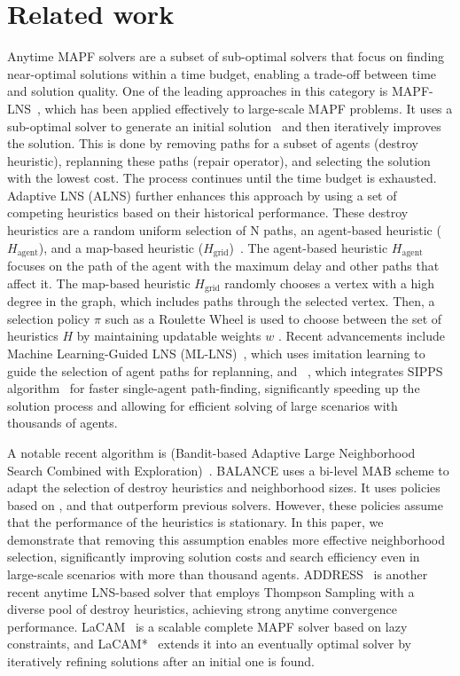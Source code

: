 \documentclass[review]{jair}
\begin{document}
\section{Related work} \label{sec:related-work}
Anytime MAPF solvers are a subset of sub-optimal solvers that focus on finding near-optimal solutions within a time budget, enabling a trade-off between time and solution quality. One of the leading approaches in this category is MAPF-LNS~\citep{LNS}, which has been applied effectively to large-scale MAPF problems. It uses a sub-optimal solver to generate an initial solution~\citep{PP, PPS} and then iteratively improves the solution. This is done by removing paths for a subset of agents (destroy heuristic), replanning these paths (repair operator), and selecting the solution with the lowest cost. The process continues until the time budget is exhausted. Adaptive LNS (ALNS) further enhances this approach by using a set of competing heuristics based on their historical performance. These destroy heuristics are a random uniform selection of N paths, an agent-based heuristic ($H_{\text{agent}}$), and a map-based heuristic ($H_{\text{grid}}$)~\citep{LNS}. The agent-based heuristic $H_{\text{agent}}$ focuses on the path of the agent with the maximum delay and other paths that affect it. The map-based heuristic $H_{\text{grid}}$ randomly chooses a vertex with a high degree in the graph, which includes paths through the selected vertex. Then, a selection policy $\pi$ such as a Roulette Wheel is used to choose between the set of heuristics $H$ by maintaining updatable weights $w$ \citep{ori-LNS}.
Recent advancements include Machine Learning-Guided LNS (ML-LNS)~\citep{ML-LNS}, which uses imitation learning to guide the selection of agent paths for replanning, and ~\citep{LNS2}, which integrates SIPPS algorithm~\citep{SIPP} for faster single-agent path-finding, significantly speeding up the solution process and allowing for efficient solving of large scenarios with thousands of agents.

A notable recent algorithm is  (Bandit-based Adaptive Large Neighborhood Search Combined with Exploration)~\citep{Balance}. BALANCE uses a bi-level MAB scheme to adapt the selection of destroy heuristics and neighborhood sizes. It uses policies based on , and  that outperform previous  solvers. However, these policies assume that the performance of the heuristics is stationary. In this paper, we demonstrate that removing this assumption enables more effective neighborhood selection, significantly improving solution costs and search efficiency even in large-scale scenarios with more than thousand agents. ADDRESS~\citep{ADDRESS} is another recent anytime LNS-based solver that employs Thompson Sampling with a diverse pool of destroy heuristics, achieving strong anytime convergence performance. LaCAM~\citep{LaCam} is a scalable complete MAPF solver based on lazy constraints, and LaCAM*~\citep{LaCamStar} extends it into an eventually optimal solver by iteratively refining solutions after an initial one is found. 
\end{document}
